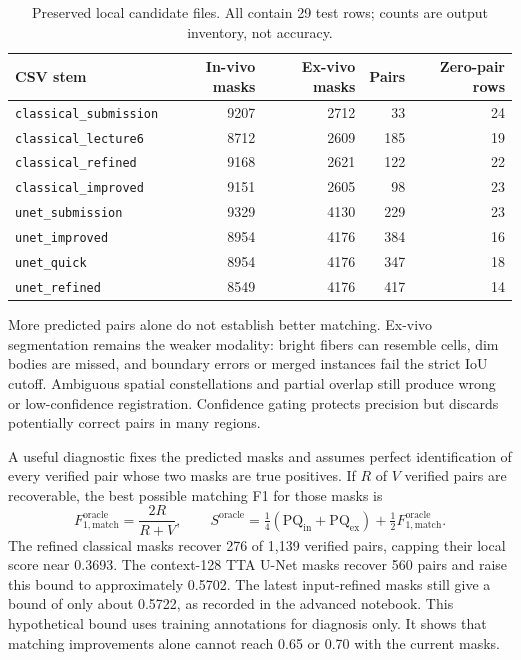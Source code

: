 \documentclass[11pt]{article}
\newcommand{\PQ}{\mathrm{PQ}}
\newcommand{\Fone}{F_{1,\mathrm{match}}}
\begin{document}
\begin{table}[htbp]
\centering\small
\caption{Preserved local candidate files. All contain 29 test rows; counts are output inventory, not accuracy.}
\begin{tabularx}{\linewidth}{@{}Xrrrr@{}}
\toprule
CSV stem & In-vivo masks & Ex-vivo masks & Pairs & Zero-pair rows\\
\midrule
\texttt{classical\_submission} & 9207 & 2712 & 33 & 24\\
\texttt{classical\_lecture6} & 8712 & 2609 & 185 & 19\\
\texttt{classical\_refined} & 9168 & 2621 & 122 & 22\\
\texttt{classical\_improved} & 9151 & 2605 & 98 & 23\\
\texttt{unet\_submission} & 9329 & 4130 & 229 & 23\\
\texttt{unet\_improved} & 8954 & 4176 & 384 & 16\\
\texttt{unet\_quick} & 8954 & 4176 & 347 & 18\\
\texttt{unet\_refined} & 8549 & 4176 & 417 & 14\\
\bottomrule
\end{tabularx}
\end{table}

More predicted pairs alone do not establish better matching. Ex-vivo segmentation remains the weaker modality: bright fibers can resemble cells, dim bodies are missed, and boundary errors or merged instances fail the strict IoU cutoff. Ambiguous spatial constellations and partial overlap still produce wrong or low-confidence registration. Confidence gating protects precision but discards potentially correct pairs in many regions.

A useful diagnostic fixes the predicted masks and assumes perfect identification of every verified pair whose two masks are true positives. If $R$ of $V$ verified pairs are recoverable, the best possible matching F1 for those masks is
\begin{equation}
\Fone^{\mathrm{oracle}}=\frac{2R}{R+V},\qquad
S^{\mathrm{oracle}}=\tfrac14(\PQ_{\mathrm{in}}+\PQ_{\mathrm{ex}})
+\tfrac12\Fone^{\mathrm{oracle}}.
\end{equation}
The refined classical masks recover 276 of 1,139 verified pairs, capping their local score near 0.3693. The context-128 TTA U-Net masks recover 560 pairs and raise this bound to approximately 0.5702. The latest input-refined masks still give a bound of only about 0.5722, as recorded in the advanced notebook. This hypothetical bound uses training annotations for diagnosis only. It shows that matching improvements alone cannot reach 0.65 or 0.70 with the current masks.
\end{document}
